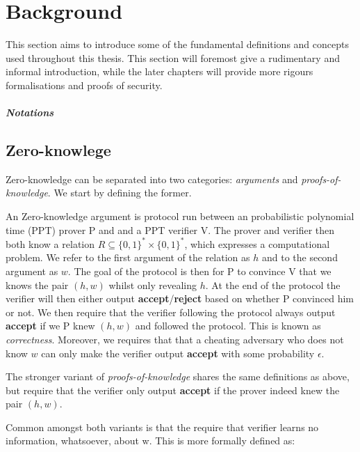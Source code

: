\chapter{Background}
\label{ch:background}
This section aims to introduce some of the fundamental definitions and concepts
used throughout this thesis. This section will foremost give a rudimentary and
informal introduction, while the later chapters will provide more rigours
formalisations and proofs of security.
%

\paragraph{Notations}

\section{Zero-knowlege}
\label{sec:background:zero-knowledge}
Zero-knowledge can be separated into two categories: \textit{arguments} and
\textit{proofs-of-knowledge}. We start by defining the former.

An Zero-knowledge argument is protocol run between an probabilistic polynomial
time (PPT) prover P and and a PPT verifier V. The prover and verifier then both
know a relation $R \subseteq \{0,1\}^{*} \times \{0,1\}^*$, which expresses a
computational problem. We refer to the first argument of the relation as $h$ and
to the second argument as $w$.
The goal of the protocol is then for P to convince V that we knows the pair
$(h,w)$ whilst only revealing $h$. At the end of the protocol the verifier will
then either output \textbf{accept}/\textbf{reject} based on whether P convinced
him or not.
We then require that the verifier following the protocol always output
\textbf{accept} if we P knew $(h,w)$ and followed the protocol. This is known as \textit{correctness}.
Moreover, we requires that that a cheating adversary who does not know $w$ can
only make the verifier output \textbf{accept} with some probability $\epsilon$.

The stronger variant of \textit{proofs-of-knowledge} shares the same definitions
as above, but require that the verifier only output \textbf{accept} if the
prover indeed knew the pair $(h,w)$.


Common amongst both variants is that the require that verifier learns no
information, whatsoever, about w. This is more formally defined as:


